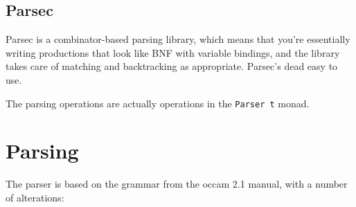 \documentclass[a4paper,12pt]{article}
\def\occam{{\sffamily occam}\xspace}
\begin{document}
\subsection{Parsec}

Parsec is a combinator-based parsing library, which means that you're
essentially writing productions that look like BNF with variable
bindings, and the library takes care of matching and backtracking as
appropriate. Parsec's dead easy to use.

The parsing operations are actually operations in the \verb|Parser t|
monad.

\section{Parsing}

The parser is based on the grammar from the \occam 2.1 manual, with a
number of alterations:
\end{document}
